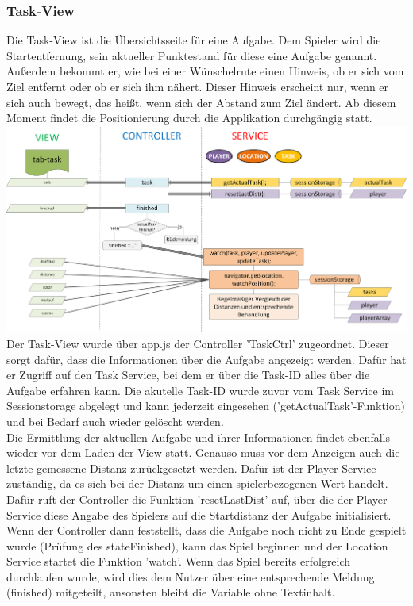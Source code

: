\subsubsection{Task-View}
%
%
Die Task-View ist die Übersichtsseite für eine Aufgabe. Dem Spieler wird die Startentfernung, sein aktueller Punktestand für diese eine Aufgabe genannt. Außerdem bekommt er, wie bei einer Wünschelrute einen Hinweis, ob er sich vom Ziel entfernt oder ob er sich ihm nähert. Dieser Hinweis erscheint nur, wenn er sich auch bewegt, das heißt, wenn sich der Abstand zum Ziel ändert. Ab diesem Moment findet die Positionierung durch die Applikation durchgängig statt.
%
%
\\ \includegraphics[width=1\textwidth]{ref/images/05-task-tab.png} \\
%
%
Der Task-View wurde über app.js der Controller 'TaskCtrl' zugeordnet. Dieser sorgt dafür, dass die Informationen über die Aufgabe angezeigt werden. Dafür hat er Zugriff auf den Task Service, bei dem er über die Task-ID alles über die Aufgabe erfahren kann. Die akutelle Task-ID wurde zuvor vom Task Service im Sessionstorage abgelegt und kann jederzeit eingesehen ('getActualTask'-Funktion) und bei Bedarf auch wieder gelöscht werden.
\\
Die Ermittlung der aktuellen Aufgabe und ihrer Informationen findet ebenfalls wieder vor dem Laden der View statt. Genauso muss vor dem Anzeigen auch die letzte gemessene Distanz zurückgesetzt werden. Dafür ist der Player Service zuständig, da es sich bei der Distanz um einen spielerbezogenen Wert handelt. Dafür ruft der Controller die Funktion 'resetLastDist' auf, über die der Player Service diese Angabe des Spielers auf die Startdistanz der Aufgabe initialisiert.
\\
Wenn der Controller dann feststellt, dass die Aufgabe noch nicht zu Ende gespielt wurde (Prüfung des stateFinished), kann das Spiel beginnen und der Location Service startet die Funktion 'watch'. Wenn das Spiel bereits erfolgreich durchlaufen wurde, wird dies dem Nutzer über eine entsprechende Meldung (finished) mitgeteilt, ansonsten bleibt die Variable ohne Textinhalt.

